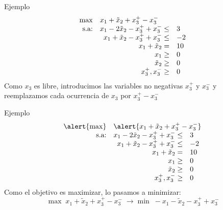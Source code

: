 \documentclass[10pt, aspectratio=169]{beamer}
\begin{document}
    \begin{frame}{Ejemplo}
        \[\begin{array}{rrl}
              \max & \multicolumn{2}{l}{x_1 + \tilde{x}_2 + x_3^+-x_3^-} \\
              \text{s.a:} & x_1 - 2\tilde{x}_2 - x_3^++x_3^- \leq & 3  \\
              & x_1 + \tilde{x}_2 - x_3^++x_3^- \leq  & -2 \\
              & x_1 + \tilde{x}_2 =                   & 10 \\
              & x_1\geq                               & 0  \\
              & \tilde{x}_2 \geq                      & 0  \\
              & x_3^+ ,x_3^- \geq                     & 0
        \end{array}
        \]
        Como $x_3$ es libre, introducimos las variables no negativas $x_3^+$ y $x_3^-$ y reemplazamos cada ocurrencia de
        $x_3$ por $x_3^+-x_3^-$
    \end{frame}

    \begin{frame}{Ejemplo}
        \[\begin{array}{rrl}
              \alert{\max} & \multicolumn{2}{l}{\alert{x_1 + \tilde{x}_2 + x_3^+-x_3^-}} \\
              \text{s.a:} & x_1 - 2\tilde{x}_2 - x_3^++x_3^- \leq & 3  \\
              & x_1 + \tilde{x}_2 - x_3^++x_3^- \leq  & -2 \\
              & x_1 + \tilde{x}_2 =                   & 10 \\
              & x_1\geq                               & 0  \\
              & \tilde{x}_2 \geq                      & 0  \\
              & x_3^+ ,x_3^- \geq                     & 0
        \end{array}
        \]
        Como el objetivo es maximizar, lo pasamos a minimizar:
        \[ \max \; x_1 + \tilde{x}_2 + x_3^+-x_3^- \; \rightarrow \min \; -x_1 - \tilde{x}_2 - x_3^++x_3^-\]
    \end{frame}
\end{document}
